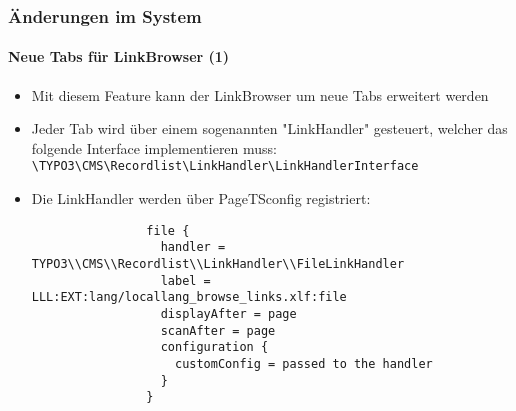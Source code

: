 
\begin{frame}[fragile]
	\frametitle{Änderungen im System}
	\framesubtitle{Neue Tabs für LinkBrowser (1)}

	\lstset{basicstyle=\tiny\ttfamily}

	\begin{itemize}

		\item Mit diesem Feature kann der LinkBrowser um neue Tabs erweitert werden

		\item Jeder Tab wird über einem sogenannten "LinkHandler" gesteuert, welcher das
			folgende Interface implementieren muss:\newline
			\small
				\texttt{\textbackslash TYPO3\textbackslash CMS\textbackslash Recordlist\textbackslash LinkHandler\textbackslash LinkHandlerInterface}
			\normalsize

		\item Die LinkHandler werden über PageTSconfig registriert:

			\begin{lstlisting}
				file {
				  handler = TYPO3\\CMS\\Recordlist\\LinkHandler\\FileLinkHandler
				  label = LLL:EXT:lang/locallang_browse_links.xlf:file
				  displayAfter = page
				  scanAfter = page
				  configuration {
				    customConfig = passed to the handler
				  }
				}
			\end{lstlisting}

	\end{itemize}

\end{frame}



